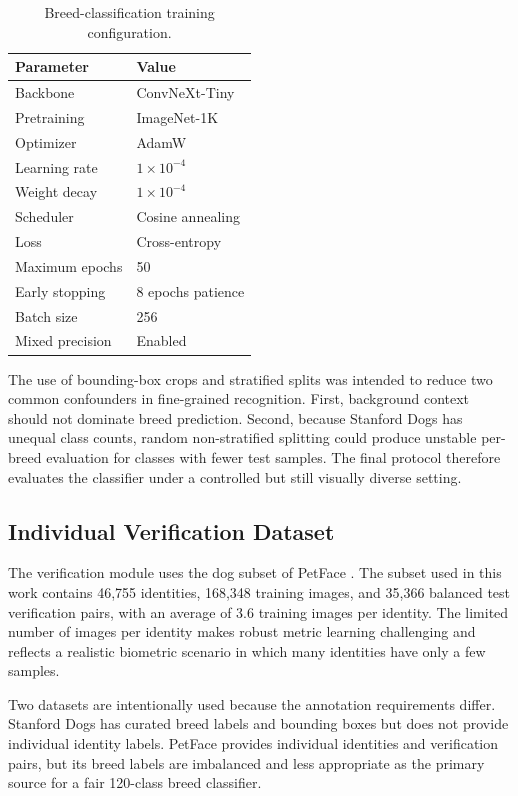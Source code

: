 \documentclass[conference]{IEEEtran}
\begin{document}
\begin{table}[t]
\centering
\caption{Breed-classification training configuration.}
\label{tab:classification_hparams}
\begin{tabular}{ll}
\toprule
Parameter & Value \\
\midrule
Backbone & ConvNeXt-Tiny \\
Pretraining & ImageNet-1K \\
Optimizer & AdamW \\
Learning rate & $1 \times 10^{-4}$ \\
Weight decay & $1 \times 10^{-4}$ \\
Scheduler & Cosine annealing \\
Loss & Cross-entropy \\
Maximum epochs & 50 \\
Early stopping & 8 epochs patience \\
Batch size & 256 \\
Mixed precision & Enabled \\
\bottomrule
\end{tabular}
\end{table}

The use of bounding-box crops and stratified splits was intended to reduce two common confounders in fine-grained recognition. First, background context should not dominate breed prediction. Second, because Stanford Dogs has unequal class counts, random non-stratified splitting could produce unstable per-breed evaluation for classes with fewer test samples. The final protocol therefore evaluates the classifier under a controlled but still visually diverse setting.

\subsection{Individual Verification Dataset}

The verification module uses the dog subset of PetFace \cite{shinoda2024petface}. The subset used in this work contains 46,755 identities, 168,348 training images, and 35,366 balanced test verification pairs, with an average of 3.6 training images per identity. The limited number of images per identity makes robust metric learning challenging and reflects a realistic biometric scenario in which many identities have only a few samples.

Two datasets are intentionally used because the annotation requirements differ. Stanford Dogs has curated breed labels and bounding boxes but does not provide individual identity labels. PetFace provides individual identities and verification pairs, but its breed labels are imbalanced and less appropriate as the primary source for a fair 120-class breed classifier.
\end{document}

